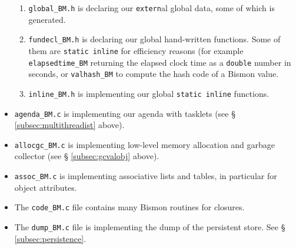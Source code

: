\begin{appendices}
\begin{itemize}
\begin{enumerate}
        \item \texttt{global\_BM.h} is declaring our \texttt{extern}al
           global data,
          some of which is generated. 
        \item \texttt{fundecl\_BM.h} is declaring our global
           hand-written functions. Some of them are
          \texttt{static inline} for efficiency reasons (for example
           
          \texttt{elapsedtime\_BM} returning the elapsed clock time as
          a \texttt{double} number in seconds, or \texttt{valhash\_BM}
          to compute the hash code of a Bismon value.

        \item \texttt{inline\_BM.h} is implementing our global \texttt{static
            inline} functions.
    \end{enumerate}

  \item \texttt{agenda\_BM.c} is implementing our agenda
     with tasklets  (see \S
    \ref{subsec:multithreadist} above).

  \item \texttt{allocgc\_BM.c} is implementing low-level memory
    allocation and garbage collector  (see \S
    \ref{subsec:gcvalobj} above).
  
  \item \texttt{assoc\_BM.c} is implementing associative lists and
           
    tables,    in
    particular for object attributes.

  \item The \texttt{code\_BM.c} file contains many Bismon routines for
           
     closures.

  \item The \texttt{dump\_BM.c} file is implementing the  dump of the
    persistent store.   See \S
      \ref{subsec:persistence}.


\end{itemize}
\end{appendices}
